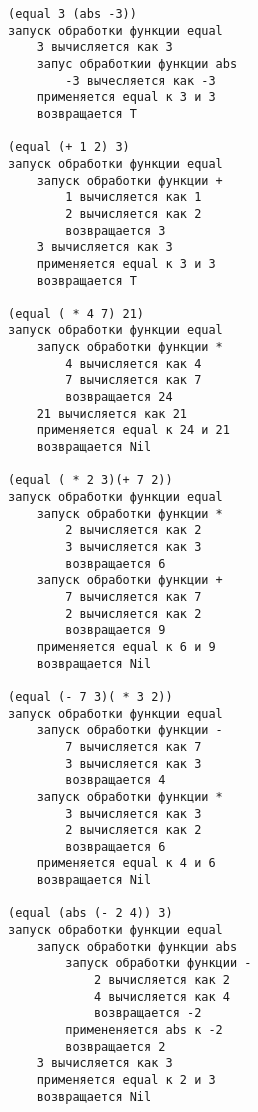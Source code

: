 \begin{lstlisting}[style=lispStyle, caption={ Представление диаграммы вычисления выражений в виде деревьев},
                    label={lst:diagram}]
(equal 3 (abs -3))
запуск обработки функции equal
    3 вычисляется как 3
    запус обработкии функции abs
        -3 вычесляется как -3
    применяется equal к 3 и 3
    возвращается T

(equal (+ 1 2) 3)
запуск обработки функции equal
    запуск обработки функции +
        1 вычисляется как 1
        2 вычисляется как 2
        возвращается 3
    3 вычисляется как 3
    применяется equal к 3 и 3
    возвращается T

(equal ( * 4 7) 21)
запуск обработки функции equal
    запуск обработки функции *
        4 вычисляется как 4
        7 вычисляется как 7
        возвращается 24
    21 вычисляется как 21
    применяется equal к 24 и 21
    возвращается Nil

(equal ( * 2 3)(+ 7 2))
запуск обработки функции equal
    запуск обработки функции *
        2 вычисляется как 2
        3 вычисляется как 3
        возвращается 6
    запуск обработки функции +
        7 вычисляется как 7
        2 вычисляется как 2
        возвращается 9
    применяется equal к 6 и 9
    возвращается Nil

(equal (- 7 3)( * 3 2))
запуск обработки функции equal
    запуск обработки функции -
        7 вычисляется как 7
        3 вычисляется как 3
        возвращается 4
    запуск обработки функции *
        3 вычисляется как 3
        2 вычисляется как 2
        возвращается 6
    применяется equal к 4 и 6
    возвращается Nil

(equal (abs (- 2 4)) 3)
запуск обработки функции equal
    запуск обработки функции abs
        запуск обработки функции -
            2 вычисляется как 2
            4 вычисляется как 4
            возвращается -2
        примененяется abs к -2
        возвращается 2
    3 вычисляется как 3
    применяется equal к 2 и 3
    возвращается Nil
\end{lstlisting}
